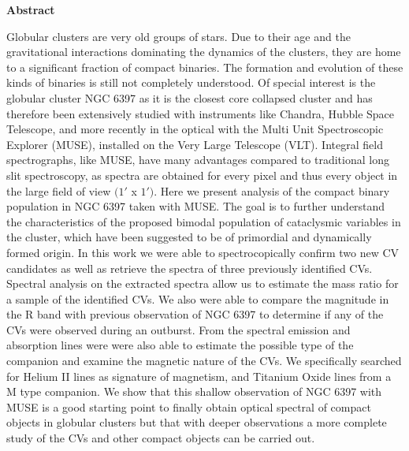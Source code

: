 \thispagestyle{empty}
\begin{Large}
\textbf{Abstract}
\end{Large}
\bigbreak
Globular clusters are very old groups of stars. Due to their age and the gravitational interactions dominating the dynamics of the clusters, they are home to a significant fraction of compact binaries. The formation
and evolution of these kinds of binaries is still not completely understood. Of special interest is the globular cluster NGC 6397 as it is the closest core collapsed cluster and has therefore been extensively studied
with instruments like Chandra, Hubble Space Telescope, and more recently in the optical with the Multi Unit Spectroscopic Explorer (MUSE), installed on the Very Large Telescope (VLT). Integral field spectrographs, like MUSE, have many advantages compared to traditional long slit spectroscopy, as spectra are obtained for every pixel and thus every object in the large field of view $(1'$ x $1')$. Here we present analysis of the compact binary population in NGC 6397 taken with MUSE. The goal is to further understand the characteristics of the proposed bimodal population of cataclysmic variables in the cluster, which have been suggested to be of primordial and dynamically formed origin. In this work we were able to spectrocopically confirm two new CV candidates as well  as retrieve the spectra of three previously identified CVs. Spectral analysis on the extracted spectra allow us to estimate the mass ratio for a sample of the identified CVs. We also were able to compare the magnitude in the R band with previous observation of NGC 6397 to determine if any of the CVs were observed during an outburst.  From the spectral emission and absorption lines were were also able to estimate the possible type of the companion and examine the magnetic nature of the CVs. We specifically searched for Helium II lines as signature of magnetism, and Titanium Oxide lines from a M type companion. We show that this shallow observation of NGC 6397 with MUSE is a good starting point to finally obtain optical spectral of compact objects in globular clusters but that with deeper observations a more complete study of the CVs and other compact objects can be carried out. 
\clearpage
